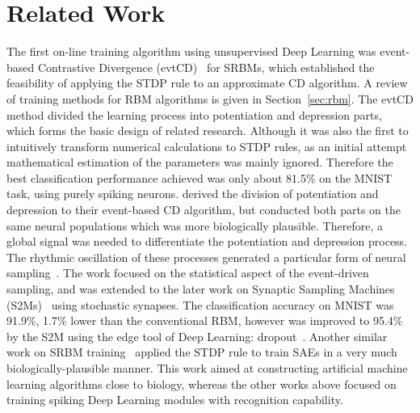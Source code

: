 \section{Related Work}
\label{sec:SRM_related}
The first on-line training algorithm using unsupervised Deep Learning was event-based Contrastive Divergence (evtCD)~\citep{neil2013online} for SRBMs, which established the feasibility of applying the STDP rule to an approximate CD algorithm.
A review of training methods for RBM algorithms is given in Section~\ref{sec:rbm}.
The evtCD method divided the learning process into potentiation and depression parts, which forms the basic design of related research.
Although it was also the first to intuitively transform numerical calculations to STDP rules, as an initial attempt mathematical estimation of the parameters was mainly ignored.
Therefore the best classification performance achieved was only about 81.5\% on the MNIST task, using purely spiking neurons.
\citet{neftci2013event} derived the division of potentiation and depression to their event-based CD algorithm, but conducted both parts on the same neural populations which was more biologically plausible.
Therefore, a global signal was needed to differentiate the potentiation and depression process.
The rhythmic oscillation of these processes generated a particular form of neural sampling~\citep{petrovici2013stochastic}.
The work focused on the statistical aspect of the event-driven sampling, and was extended to the later work on Synaptic Sampling Machines (S2Ms)~\citep{neftci2016stochastic} using stochastic synapses.
The classification accuracy on MNIST was 91.9\%, 1.7\% lower than the conventional RBM, however was improved to 95.4\% by the S2M using the edge tool of Deep Learning: dropout~\citep{srivastava2014dropout}.
Another similar work on SRBM training~\citep{burbank2015mirrored} applied the STDP rule to train SAEs in a very much biologically-plausible manner.
This work aimed at constructing artificial machine learning algorithms close to biology, whereas the other works above focused on training spiking Deep Learning modules with recognition capability.

